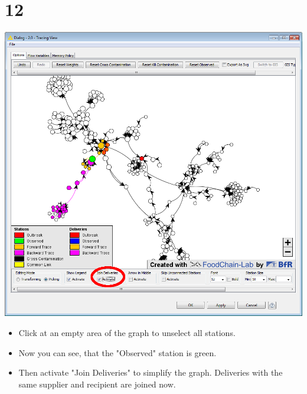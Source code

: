 \documentclass{beamer}
\begin{document}
\section{12}
\begin{frame}
	\begin{center}
  		\includegraphics[height=0.6\textheight]{12.png}
	\end{center}
	\begin{itemize}
		\item Click at an empty area of the graph to unselect all stations.
		\item Now you can see, that the "Observed" station is green.
		\item Then activate "Join Deliveries" to simplify the graph. Deliveries with the same supplier and recipient are joined now.
	\end{itemize}
\end{frame}
\end{document}
